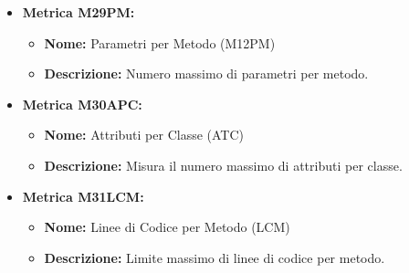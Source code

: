 \begin{itemize}
                                    

    \item \textbf{Metrica M29PM:}
        \begin{itemize}
            \item \textbf{Nome:} Parametri per Metodo (M12PM)
            \item \textbf{Descrizione:} Numero massimo di parametri per metodo.
          \end{itemize}
    
    \item \textbf{Metrica M30APC:}
          \begin{itemize}
              \item \textbf{Nome:} Attributi per Classe (ATC)
              \item \textbf{Descrizione:} Misura il numero massimo di attributi per classe.
          \end{itemize} 
          
    \item \textbf{Metrica M31LCM:}
          \begin{itemize}
              \item \textbf{Nome:} Linee di Codice per Metodo (LCM)
              \item \textbf{Descrizione:} Limite massimo di linee di codice per metodo.
          \end{itemize} 
\end{itemize}